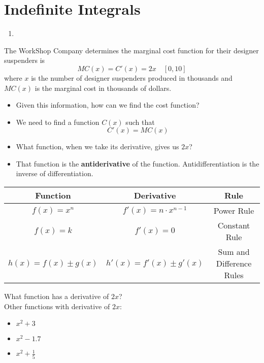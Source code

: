 \documentclass{article}
\begin{document}
\section*{Indefinite Integrals}

\begin{tcolorbox}[colframe=orange!70!white, coltitle=black, title=\textbf{Summary}]
\begin{enumerate}
    \item 
\end{enumerate}
\end{tcolorbox}
\vspace{1in}

The WorkShop Company determines the marginal cost function for their designer suspenders is
\[
MC(x) = C'(x) = 2x  \quad [0, 10]
\]
where $x$ is the number of designer suspenders produced in thousands and $MC(x)$ is the marginal cost in thousands of dollars.   \newline\\

\begin{itemize}
    \item Given this information, how can we find the cost function?
    \item We need to find a function $C(x)$ such that
\[
C'(x) = MC(x)
\]
    \item What function, when we take its derivative, gives us $2x$?
    \item That function is the {\color{blue}\textbf{antiderivative}} of the function.
        \subitem Antidifferentiation is the inverse of differentiation.
\end{itemize}

\begin{center}  \setlength{\extrarowheight}{6pt}
    \begin{tabular}{ccc}    
        Function & Derivative & Rule \\ \hline 
        $f(x)=x^n$ & $f'(x)=n\cdot x^{n-1}$ & Power Rule \\
        $f(x) = k$ & $f'(x) = 0$ & Constant Rule \\
        $h(x) = f(x) \pm g(x)$ & $h'(x) = f'(x) \pm g'(x)$ & Sum and Difference Rules
    \end{tabular}
\end{center}

What function has a derivative of $2x$? \\

Other functions with derivative of $2x$:
\begin{itemize}
    \item $x^2 + 3$
    \item $x^2 - 1.7$
    \item $x^2 + \tfrac{1}{5}$
\end{itemize}
\end{document}

